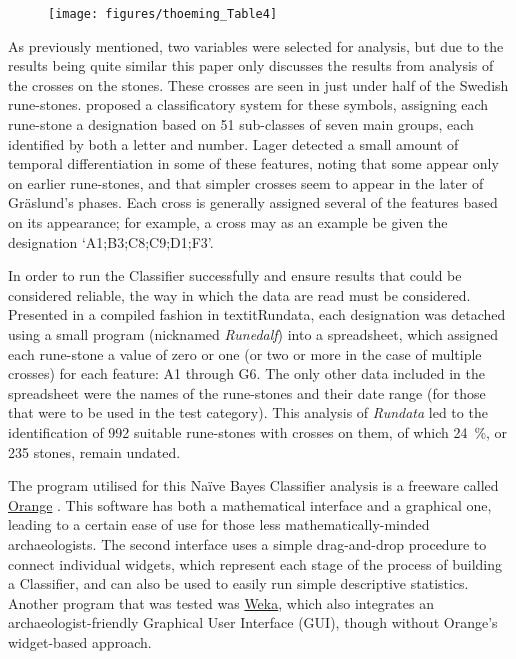 	\begin{figure}[!htb]
		\texttt{[image: figures/thoeming\_Table4]}
		\centering
		\label{fig:Table4}
	\end{figure}

As previously mentioned, two variables were selected for analysis, but due to the results being quite similar this paper only discusses the results from analysis of the crosses on the stones. These crosses are seen in just under half of the Swedish rune-stones. \textcite{Lager_2002} proposed a classificatory system for these symbols, assigning each rune-stone a designation based on 51 sub-classes of seven main groups, each identified by both a letter and number. Lager detected a small amount of temporal differentiation in some of these features, noting that some appear only on earlier rune-stones, and that simpler crosses seem to appear in the later of Gräslund’s phases. Each cross is generally assigned several of the features based on its appearance; for example, a cross may as an example be given the designation ‘A1;B3;C8;C9;D1;F3’. 

In order to run the Classifier successfully and ensure results that could be considered reliable, the way in which the data are read must be considered. Presented in a compiled fashion in textit{Rundata}, each designation was detached using a small program (nicknamed \emph{Runedalf}) into a spreadsheet, which assigned each rune-stone a value of zero or one (or two or more in the case of multiple crosses) for each feature: 
A1 through G6. The only other data included in the spreadsheet were the names of the rune-stones and their date range (for those that were to be used in the test category). This analysis of \emph{Rundata} led to the identification of 992 suitable rune-stones with crosses on them, of which \SI{24}{\percent}, or 235 stones, remain undated. 

The program utilised for this Naïve Bayes Classifier analysis is a freeware called \href{http://orange.biolab.si/}{Orange} \parencite{Demsar_2004}. This software has both a mathematical interface and a graphical one, leading to a certain ease of use for those less mathematically-minded archaeologists. The second interface uses a simple drag-and-drop procedure to connect individual widgets, which represent each stage of the process of building a Classifier, and can also be used to easily run simple descriptive statistics. Another program that was tested was \href{http://www.cs.waikato.ac.nz/ml/weka/}{Weka}, which also integrates an archaeologist-friendly Graphical User Interface (GUI), though without Orange’s widget-based approach.

